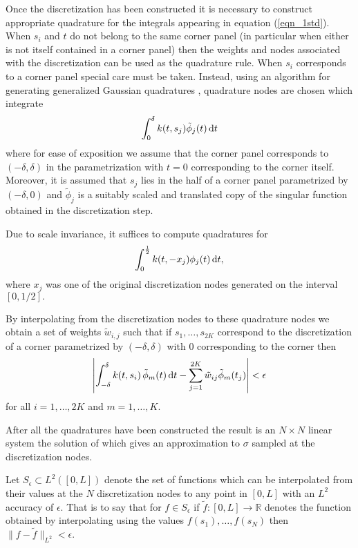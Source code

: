 Once the discretization has been constructed it is necessary to construct appropriate quadrature for the integrals appearing in equation (\ref{eqn_1std}). When $s_i$ and $t$ do not belong to the same corner panel (in particular when either is not itself contained in a corner panel) then the weights and nodes associated with the discretization can be used as the quadrature rule. When $s_i$ corresponds to a corner panel special care must be taken. Instead, using an algorithm for generating generalized Gaussian quadratures \cite{}, quadrature nodes are chosen which integrate
\begin{align}
\int_{0}^\delta k(t,s_j) \tilde{\phi}_j(t)\,{\rm d}t
\end{align} 
where for ease of exposition we assume that the corner panel corresponds to $(-\delta,\delta)$ in the parametrization with $t=0$ corresponding to the corner itself. Moreover, it is assumed that $s_j$ lies in the half of a corner panel parametrized by $(-\delta,0)$ and $\tilde{\phi}_j$ is a suitably scaled and translated copy of the singular function obtained in the discretization step.
\begin{remark1}
Due to scale invariance, it suffices to compute quadratures for 
\begin{align}
\int_{0}^\frac{1}{2} k(t,-x_j) {\phi}_j(t)\,{\rm d}t,
\end{align} 
where $x_j$ was one of the original discretization nodes generated on the interval $[0,1/2].$
\end{remark1}
\begin{remark1}
By interpolating from the discretization nodes to these quadrature nodes we obtain a set of weights $\tilde{w}_{i,j}$ such that if $s_1,\dots,s_{2K}$ correspond to the discretization of a corner parametrized by $(-\delta,\delta)$ with $0$ corresponding to the corner then
\begin{align}
\left| \int_{-\delta}^\delta k(t,s_i) \, \tilde{\phi}_m(t)\,{\rm d}t - \sum_{j=1}^{2K} \tilde{w}_{ij} \tilde{\phi}_{m}(t_j) \right| < \epsilon
\end{align}
for all $i=1,\dots,2K$ and $m=1,\dots,K.$
\end{remark1}

After all the quadratures have been constructed the result is an $N \times N$ linear system the solution of which gives an approximation to $\sigma$ sampled at the discretization nodes. 

\begin{definition}\label{def:seps}
Let $S_\epsilon \subset L^2([0,L])$ denote the set of functions which can be interpolated from their values at the $N$ discretization nodes to any point in $[0,L]$ with an $L^2$ accuracy of $\epsilon.$ That is to say that for $f \in S_\epsilon$ if $\tilde{f}:[0,L] \to \mathbb{R}$ denotes the function obtained by interpolating using the values $f(s_1),\dots,f(s_N)$ then $\|f -\tilde{f}\|_{L^2} < \epsilon.$ 
\end{definition}

